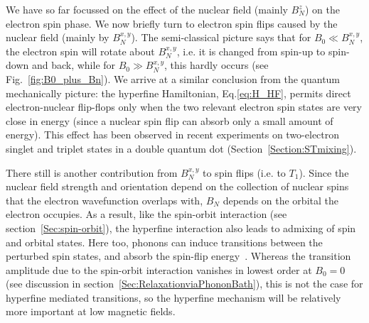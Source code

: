 \documentclass[rmp,twocolumn,aps]{revtex4}
\begin{document}
We have so far focussed on the effect of the nuclear field (mainly $B_N^z$) on the electron spin phase. We now briefly turn to electron spin flips caused by the nuclear field (mainly by $B_N^{x,y}$). The semi-classical picture says that for $B_0 \ll B_N^{x,y}$, the electron spin will rotate about $B_N^{x,y}$, i.e. it is changed from spin-up to spin-down and back, while for $B_0 \gg B_N^{x,y}$, this hardly occurs (see Fig.~\ref{fig:B0_plus_Bn}). We arrive at a similar conclusion from the quantum mechanically picture: the hyperfine Hamiltonian, Eq.\ref{eq:H_HF}, permits direct electron-nuclear flip-flops only when the two relevant electron spin states are very close in energy (since a nuclear spin flip can absorb only a small amount of energy). This effect has been observed in recent experiments on two-electron singlet and triplet states in a double quantum dot\cite{johnson05} (Section~\ref{Section:STmixing}).

There still is another contribution from $B_N^{x,y}$ to spin flips (i.e. to $T_1$). Since the nuclear field strength and orientation depend on the collection of nuclear spins that the electron wavefunction overlaps with, $B_N$ depends on the orbital the electron occupies. As a result, like the spin-orbit interaction (see section~\ref{Sec:spin-orbit}), the hyperfine interaction also leads to admixing of spin and orbital states. Here too, phonons can induce transitions between the perturbed spin states, and absorb the spin-flip energy~\cite{erlingsson01,erlingsson02,erlingsson04,abalmassov04}.
Whereas the transition amplitude due to the spin-orbit interaction
vanishes in lowest order at $B_0=0$ (see discussion in section~\ref{Sec:RelaxationviaPhononBath}), this is not the case for hyperfine mediated transitions, so the hyperfine mechanism will
be relatively more important at low magnetic fields.


\end{document}
